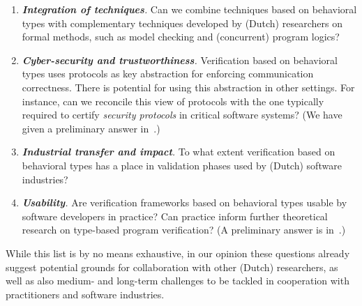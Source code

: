 \documentclass[sigplan,10pt]{acmart}\settopmatter{printfolios=false,printccs=false,printacmref=false}
\begin{document}
\begin{enumerate}[-]
\item \emph{\textbf{Integration of techniques}.} Can we combine techniques based on behavioral types with complementary techniques developed by (Dutch) researchers on formal methods, such as model checking and (concurrent) program logics?

\item \emph{\textbf{Cyber-security and trustworthiness}.} Verification based on behavioral types uses protocols as key abstraction for enforcing communication correctness. 
There is potential for using this abstraction in other settings. For instance, 
can we reconcile this view of protocols with the one typically required to certify \emph{security protocols} in critical software systems?
(We have given a   preliminary  answer  in~\cite{DBLP:conf/forte/NantesP18}.)

\item \emph{\textbf{Industrial transfer and impact}.}
To what extent verification based on behavioral types has a place in validation phases used by (Dutch) software industries?

\item \emph{\textbf{Usability}.}  Are verification frameworks based on behavioral types usable by software developers in practice? Can practice inform further theoretical research on type-based program verification? (A preliminary  answer is in~\cite{DBLP:conf/oopsla/VoineaG16}.)



\end{enumerate}

\noindent
While this list is by no means exhaustive, in our opinion these questions already suggest  potential grounds for collaboration with other (Dutch) researchers, as well as also medium- and long-term 
challenges to be tackled in cooperation with practitioners and software industries.



\end{document}

